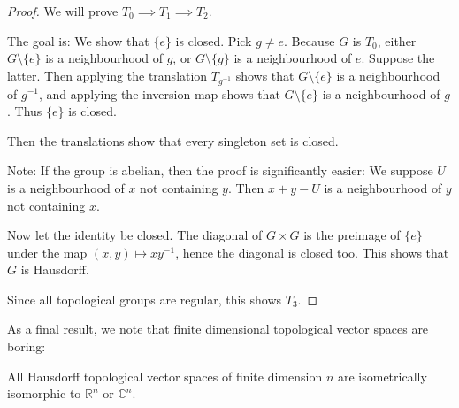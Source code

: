 \documentclass[twoside,symmetric, openany, 12pt]{./tuftebook}
\theoremstyle{definition}
\theoremstyle{definition}
\theoremstyle{definition}
\newcommand{\R}{\mathbb{R}}
\newcommand{\C}{\mathbb{C}}
\begin{document}
\begin{proof}
	We will prove $T_0\implies T_1\implies T_2$. 
	
	The goal is: We show that $\{e\}$ is closed. Pick $g\neq e$. Because $G$ is $T_0$, either $G \setminus \{e\}$ is a neighbourhood of $g$, or $G \setminus \{g\}$ is a neighbourhood of $e$. Suppose the latter. Then applying the translation $T_{g^{-1}}$ shows that $G \setminus \{e\}$ is a neighbourhood of $g^{-1}$, and applying the inversion map shows that $G \setminus \{e\}$ is a neighbourhood of $g$. Thus $\{e\}$ is closed.
	
	Then the translations show that every singleton set is closed.
	
	Note: If the group is abelian, then the proof is significantly easier: We suppose $U$ is a neighbourhood of $x$ not containing $y$. Then $x+y-U$ is a neighbourhood of $y$ not containing $x$. 
	
	Now let the identity be closed. The diagonal of $G\times G$ is the preimage of $\{e\}$ under the map $(x,y)\mapsto xy^{-1}$, hence the diagonal is closed too. This shows that $G$ is Hausdorff.
	
	Since all topological groups are regular, this shows $T_3$.
\end{proof}
As a final result, we note that finite dimensional topological vector spaces are boring:
\begin{Theorem}\label{thm:finitedimboring}
	All Hausdorff topological vector spaces of finite dimension $n$ are isometrically isomorphic to $\R^n$ or $\C^n$.
\end{Theorem}
\end{document}
